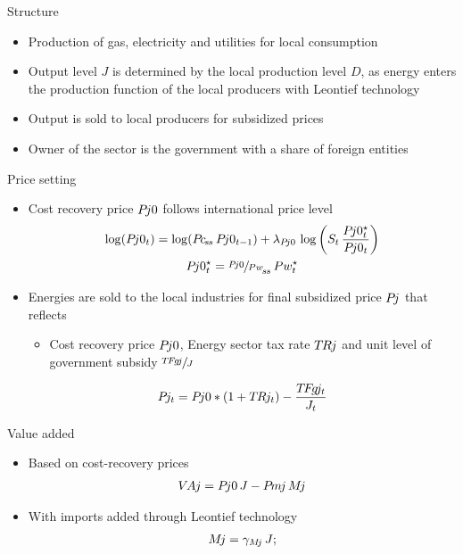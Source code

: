 \begin{frame}{Structure}
  
  \begin{itemize}
    \item Production of gas, electricity and utilities for local consumption
    \item Output level $J$ is determined by the local production level $D$, as energy enters the production function of the local producers with Leontief technology
    \item Output is sold to local producers for subsidized prices
    \item Owner of the sector is the government with a share of foreign entities
  \end{itemize}
  
\end{frame}

\begin{frame}{Price setting}
  \begin{itemize}
    \item Cost recovery price $P\hspace{-0.15em}j0$ follows international price level
    \small
    \vspace*{-6mm}
    \begin{gather*}
      \log(P\hspace{-0.15em}j0_t) = \log({P\hspace{-0.15em}c}_{\hspace{-0.10em}s\hspace{-0.05em}s} \, P\hspace{-0.15em}j0_{t-1}) + \lambda_{P\hspace{-0.15em}j0} \, \log \left( S_t \, \frac{P\hspace{-0.15em}j0^\star_t}{P\hspace{-0.15em}j0_t} \right) \\
      P\hspace{-0.15em}j0_t^\star = {\sfrac{P\hspace{-0.15em}j0}{Pw}}_{\hspace{-0.10em}s\hspace{-0.05em}s}\, Pw_t^\star
    \end{gather*}
    \item Energies are sold to the local industries for final subsidized price $P\hspace{-0.15em}j$ that reflects
    \begin{itemize}
      \item Cost recovery price $P\hspace{-0.15em}j0$, Energy sector tax rate $T\hspace{-0.1em}R\hspace{-0.075em}j$ and unit level of government subsidy $\sfrac{T\hspace{-0.125em}F\hspace{-0.15em}g\hspace{-0.15em}j}{J}$
    \end{itemize}
    \small
    \vspace*{-4mm}
    \begin{gather*}
      P\hspace{-0.15em}j_t = P\hspace{-0.15em}j0*(1 + T\hspace{-0.1em}R\hspace{-0.075em}j_t) - \frac{T\hspace{-0.125em}F\hspace{-0.15em}g\hspace{-0.15em}j_t}{J_t}
    \end{gather*}
  \end{itemize}
\end{frame}

\begin{frame}{Value added}
  \begin{itemize}
    \item Based on cost-recovery prices
    \begin{gather*}
      V\hspace{-0.125em}A\hspace{-0.05em}j = P\hspace{-0.15em}j0 \, J - P\hspace{-0.15em}m\hspace{-0.12em}j \, M\hspace{-0.15em}j
    \end{gather*}
    \item With imports added through Leontief technology
    \begin{gather*}
      M\hspace{-0.15em}j = \gamma_{M\hspace{-0.15em}j} \, J;
    \end{gather*}
  \end{itemize}
\end{frame}

